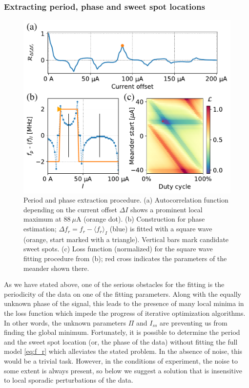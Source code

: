 \documentclass[%
 aip,
 amsmath,amssymb,
 reprint,%
]{revtex4-1}
\begin{document}
\subsubsection{Extracting period, phase and sweet spot locations}
\begin{figure}
\centering
\includegraphics[width=\linewidth]{per+phase}
\caption{Period and phase extraction procedure. (a) Autocorrelation function depending on the current offset $\Delta I$ shows a prominent local maximum at $88\ \mu$A (orange dot). (b) Construction for phase estimation; $\Delta f_r = f_r-\langle f_r \rangle_{I}$ (blue) is fitted with a square wave (orange, start marked with a triangle). Vertical bars mark candidate sweet spots. (c) Loss function (normalized) for the square wave fitting procedure from (b); red cross indicates the parameters of the meander shown there.}
\label{fig:per+phase}
\end{figure}
As we have stated above, one of the serious obstacles for the fitting is the periodicity of the data on one of the fitting parameters. Along with the equally unknown phase of the signal, this leads to the presence of many local minima in the loss function which impede the progress of iterative optimization algorithms. In other words, the unknown parameters $\Pi$ and $I_{ss}$ are preventing us from finding the global minimum. Fortunately, it is possible to determine the period and the sweet spot location (or, the phase of the data) without fitting the full model \eqref{eq:f_r} which alleviates the stated problem. In the absence of noise, this would be a trivial task. However, in the conditions of experiment, the noise to some extent is always present, so below we suggest a solution that is insensitive to local sporadic perturbations of the data.
\end{document}

